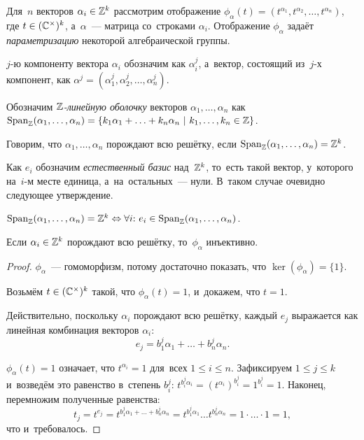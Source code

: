 \documentclass{article}
\begin{document}
Для~$n$ векторов $\alpha_i \in \mathbb{Z}^k$ рассмотрим отображение $\phi_\alpha(t) = (t^{\alpha_1}, t^{\alpha_2}, \ldots, t^{\alpha_n})$,
где $t \in (\mathbb{C}^\times)^k$, а~$\alpha$~— матрица со~строками $\alpha_i$.
Отображение $\phi_\alpha$ задаёт \textit{параметризацию} некоторой алгебраической группы.

$j$-ю компоненту вектора $\alpha_i$ обозначим как $\alpha_i^j$, а~вектор, состоящий
из~$j$-х компонент, как $\alpha^j = (\alpha_1^j, \alpha_2^j, \ldots, \alpha_n^j)$.

Обозначим \textit{$\mathbb{Z}$-линейную оболочку} векторов $\alpha_1, \ldots, \alpha_n$ как
$\mathrm{Span}_{\mathbb{Z}}(\alpha_1, \ldots, \alpha_n) = \{ k_1 \alpha_1 + \ldots + k_n \alpha_n \ | \ k_1, \ldots, k_n \in \mathbb{Z} \}$.

Говорим, что $\alpha_1, \ldots, \alpha_n$ порождают всю решётку, если $\mathrm{Span}_{\mathbb{Z}}(\alpha_1, \ldots, \alpha_n) = \mathbb{Z}^k$.

Как $e_i$ обозначим \textit{естественный базис} над~$\mathbb{Z}^k$, то~есть такой вектор, у~которого на~$i$-м месте единица, а~на~остальных~— нули.
В~таком случае очевидно следующее утверждение.

\begin{statement*}
    $\mathrm{Span}_{\mathbb{Z}}(\alpha_1, \ldots, \alpha_n) = \mathbb{Z}^k \Leftrightarrow \forall i{:}\ e_i \in \mathrm{Span}_{\mathbb{Z}}(\alpha_1, \ldots, \alpha_n)$.
\end{statement*}

\begin{lemma*}
    Если $\alpha_i \in \mathbb{Z}^k$ порождают всю решётку, то~$\phi_\alpha$ инъективно.
\end{lemma*}

\begin{proof}
    $\phi_\alpha$~— гомоморфизм, потому достаточно показать, что $\ker(\phi_\alpha) = \{1\}$.

    Возьмём $t \in (\mathbb{C}^\times)^k$ такой, что $\phi_\alpha(t) = 1$, и~докажем, что $t = 1$.

    Действительно, поскольку $\alpha_i$ порождают всю решётку, каждый $e_j$ выражается как линейная комбинация векторов $\alpha_i$:
    $$
        e_j = b^j_1 \alpha_1 + \ldots + b^j_n \alpha_n.
    $$

    $\phi_\alpha(t) = 1$ означает, что $t^{\alpha_i} = 1$ для~всех $1 \leq i \leq n$.
    Зафиксируем $1 \leq j \leq k$ и~возведём это равенство в~степень $b^j_i$: $t^{b^j_i \alpha_i} = (t^{\alpha_i})^{b^j_i} = 1^{b^j_i} = 1$.
    Наконец, перемножим полученные равенства:
    $$
        t_j = t^{e_j} = t^{b^j_1 \alpha_1 + \ldots + b^j_n \alpha_n} = t^{b^j_1 \alpha_1} \ldots t^{b^j_n \alpha_n} = 1 \cdot \ldots \cdot 1 = 1,
    $$
    что и~требовалось.
\end{proof}
\end{document}
